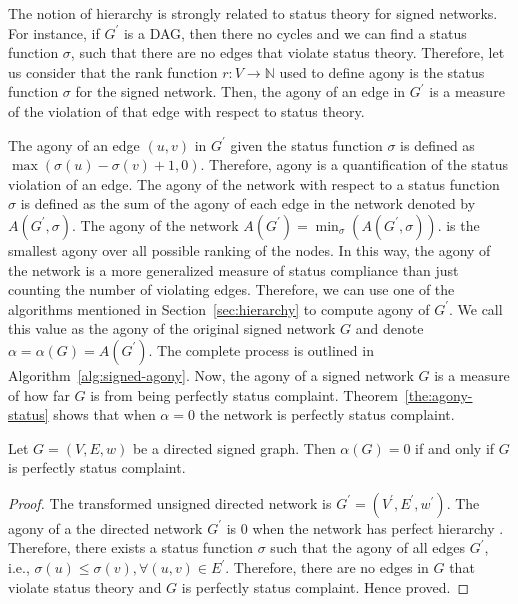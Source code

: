 The notion of hierarchy is strongly related to status theory for signed networks.
For instance, if $G^\prime$ is a DAG, then there no cycles and we can find a status function $\sigma$, such that there are no edges that violate status theory.
Therefore, let us consider that the rank function $r:V\rightarrow \mathbb{N}$ used to define agony is the status function $\sigma$ for the signed network.
Then, the agony of an edge in $G^\prime$ is a measure of the violation of that edge with respect to status theory.

The agony of an edge $(u,v)$ in $G^\prime$ given the status function $\sigma$ is defined as $\max(\sigma(u)-\sigma(v)+1,0)$.
Therefore, agony is a quantification of the status violation of an edge.
The agony of the network with respect to a status function $\sigma$ is defined as the sum of the agony of each edge in the network denoted by $A(G^\prime,\sigma)$.
The agony of the network $A(G^\prime)= \min_\sigma(A(G^\prime,\sigma))$. is the smallest agony over all possible ranking of the nodes.
In this way, the agony of the network is a more generalized measure of status compliance than just counting the number of violating edges.
Therefore, we can use one of the algorithms mentioned in Section~\ref{sec:hierarchy} to compute agony of $G^\prime$.
We call this value as the agony of the original signed network $G$ and denote $\alpha = \alpha(G) = A(G^\prime)$.
The complete process is outlined in Algorithm~\ref{alg:signed-agony}.
Now, the agony of a signed network $G$ is a measure of how far $G$ is from being perfectly status complaint.
Theorem~\ref{the:agony-status} shows that when $\alpha=0$ the network is perfectly status complaint. 

\begin{theorem}
\label{the:agony-status}
Let $G=(V,E,w)$ be a directed signed graph.
Then $\alpha(G)=0$ if and only if $G$ is perfectly status complaint.
\end{theorem}
\begin{proof}
    The transformed unsigned directed network is $G^\prime=(V^\prime,E^\prime,w^\prime)$. The agony of a the directed network $G^\prime$ is 0 when the network has perfect hierarchy \cite{gupte2011finding}. Therefore, there exists a status function $\sigma$ such that the agony of all edges $G^\prime$, i.e., $\sigma(u) \leq \sigma(v), \forall (u,v)\in E^\prime$. Therefore, there are no edges in $G$ that violate status theory and $G$ is perfectly status complaint. Hence proved.
\end{proof}

